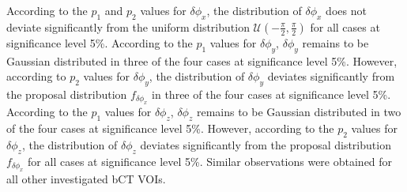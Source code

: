 \documentclass[journal]{IEEEtran}
\begin{document}


According to the $p_1$ and $p_2$ values for $\delta\phi_x$, the
distribution of $\delta\phi_x$ does not deviate significantly from the
uniform distribution $\mathcal{U}(-\frac{\pi}{2}, \frac{\pi}{2})$ for
all cases at significance level 5\%. According to the $p_1$ values for
$\delta\phi_y$, $\delta\phi_y$ remains to be Gaussian distributed in
three of the four cases at significance level 5\%. However, according
to $p_2$ values for $\delta\phi_y$, the distribution of $\delta\phi_y$
deviates significantly from the proposal distribution
$f_{\delta{\phi_x}}$ in three of the four cases at significance level
5\%. According to the $p_1$ values for $\delta\phi_z$, $\delta\phi_z$
remains to be Gaussian distributed in two of the four cases at
significance level 5\%. However, according to the $p_2$ values for
$\delta\phi_z$, the distribution of $\delta\phi_z$ deviates
significantly from the proposal distribution $f_{\delta{\phi_x}}$ for
all cases at significance level 5\%. Similar observations were
obtained for all other investigated bCT VOIs.




\end{document}
